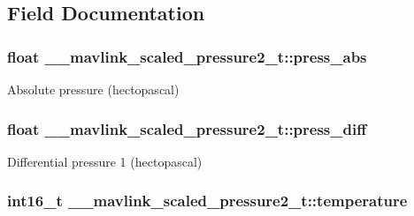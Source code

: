 \subsection{Field Documentation}
\hypertarget{struct____mavlink__scaled__pressure2__t_a46f45f1bda8f24751d9587060838dfa7}{
\subsubsection[{press\+\_\+abs}]{\setlength{\rightskip}{0pt plus 5cm}float \+\_\+\+\_\+mavlink\+\_\+scaled\+\_\+pressure2\+\_\+t\+::press\+\_\+abs}}\label{struct____mavlink__scaled__pressure2__t_a46f45f1bda8f24751d9587060838dfa7}


Absolute pressure (hectopascal) 

\hypertarget{struct____mavlink__scaled__pressure2__t_a53e03eb25647492f811a6aff8f81f1ac}{
\subsubsection[{press\+\_\+diff}]{\setlength{\rightskip}{0pt plus 5cm}float \+\_\+\+\_\+mavlink\+\_\+scaled\+\_\+pressure2\+\_\+t\+::press\+\_\+diff}}\label{struct____mavlink__scaled__pressure2__t_a53e03eb25647492f811a6aff8f81f1ac}


Differential pressure 1 (hectopascal) 

\hypertarget{struct____mavlink__scaled__pressure2__t_adc3cdcdb6b7997cd7036db4949485c9f}{
\subsubsection[{temperature}]{\setlength{\rightskip}{0pt plus 5cm}int16\+\_\+t \+\_\+\+\_\+mavlink\+\_\+scaled\+\_\+pressure2\+\_\+t\+::temperature}}\label{struct____mavlink__scaled__pressure2__t_adc3cdcdb6b7997cd7036db4949485c9f}


